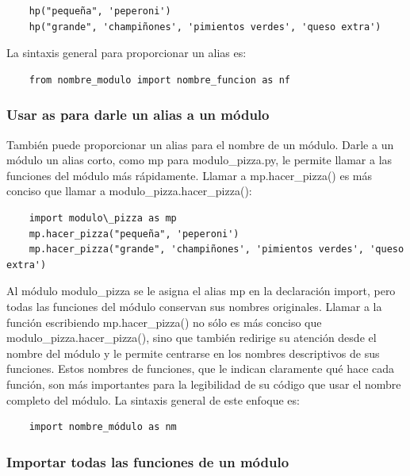\begin{lstlisting}
	hp("pequeña", 'peperoni')
	hp("grande", 'champiñones', 'pimientos verdes', 'queso extra')
\end{lstlisting}

La sintaxis general para proporcionar un alias es:

\begin{lstlisting}
	from nombre_modulo import nombre_funcion as nf	
\end{lstlisting}

\subsubsection{Usar {\ttfamily as} para darle un alias a un módulo}

También puede proporcionar un alias para el nombre de un módulo. Darle a un módulo un alias corto, como {\ttfamily mp} para {\ttfamily modulo\_pizza.py}, le permite llamar a las funciones del módulo más rápidamente. Llamar a {\ttfamily mp.hacer\_pizza()} es más conciso que llamar a  {\ttfamily modulo\_pizza.hacer\_pizza()}:

\begin{lstlisting}
	import modulo\_pizza as mp
	mp.hacer_pizza("pequeña", 'peperoni')
	mp.hacer_pizza("grande", 'champiñones', 'pimientos verdes', 'queso extra')
\end{lstlisting}

Al módulo {\ttfamily modulo\_pizza} se le asigna el alias {\ttfamily mp} en la declaración {\ttfamily import}, pero todas las funciones del módulo conservan sus nombres originales. Llamar a la función escribiendo {\ttfamily mp.hacer\_pizza()} no sólo es más conciso que {\ttfamily modulo\_pizza.hacer\_pizza()}, sino que también redirige su atención desde el nombre del módulo y le permite centrarse en los nombres descriptivos de sus funciones. Estos nombres de funciones, que le indican claramente qué hace cada función, son más importantes para la legibilidad de su código que usar el nombre completo del módulo. La sintaxis general de este enfoque es:

\begin{lstlisting}
	import nombre_módulo as nm
\end{lstlisting}

\subsubsection{Importar todas las funciones de un módulo}


